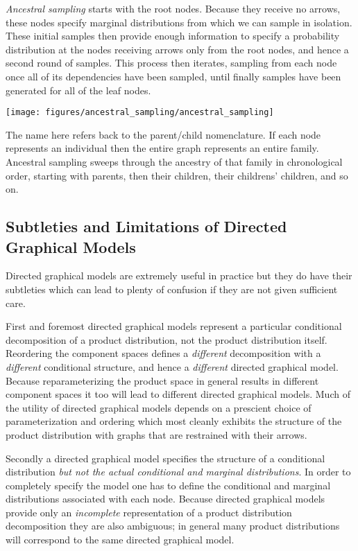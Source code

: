 \documentclass[]{article}
\begin{document}
\emph{Ancestral sampling} starts with the root nodes. Because they
receive no arrows, these nodes specify marginal distributions from which
we can sample in isolation. These initial samples then provide enough
information to specify a probability distribution at the nodes receiving
arrows only from the root nodes, and hence a second round of samples.
This process then iterates, sampling from each node once all of its
dependencies have been sampled, until finally samples have been
generated for all of the leaf nodes.

\texttt{[image: figures/ancestral\_sampling/ancestral\_sampling]}

The name here refers back to the parent/child nomenclature. If each node
represents an individual then the entire graph represents an entire
family. Ancestral sampling sweeps through the ancestry of that family in
chronological order, starting with parents, then their children, their
childrens' children, and so on.

\hypertarget{subtleties-and-limitations-of-directed-graphical-models}{%
\subsection{Subtleties and Limitations of Directed Graphical
Models}\label{subtleties-and-limitations-of-directed-graphical-models}}

Directed graphical models are extremely useful in practice but they do
have their subtleties which can lead to plenty of confusion if they are
not given sufficient care.

First and foremost directed graphical models represent a particular
conditional decomposition of a product distribution, not the product
distribution itself. Reordering the component spaces defines a
\emph{different} decomposition with a \emph{different} conditional
structure, and hence a \emph{different} directed graphical model.
Because reparameterizing the product space in general results in
different component spaces it too will lead to different directed
graphical models. Much of the utility of directed graphical models
depends on a prescient choice of parameterization and ordering which
most cleanly exhibits the structure of the product distribution with
graphs that are restrained with their arrows.

Secondly a directed graphical model specifies the structure of a
conditional distribution \emph{but not the actual conditional and
marginal distributions}. In order to completely specify the model one
has to define the conditional and marginal distributions associated with
each node. Because directed graphical models provide only an
\emph{incomplete} representation of a product distribution decomposition
they are also ambiguous; in general many product distributions will
correspond to the same directed graphical model.
\end{document}
